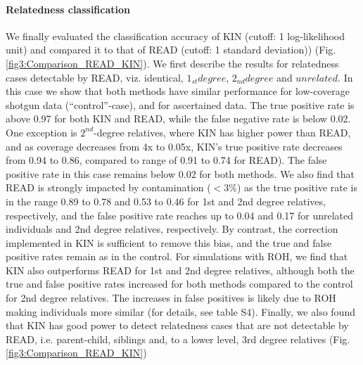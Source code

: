 \documentclass[12pt, letterpaper]{article}
\begin{document}
\paragraph{Relatedness classification}
We finally evaluated the classification accuracy of KIN (cutoff: 1 log-likelihood unit) and compared it to that of READ (cutoff: 1 standard deviation)) (Fig. \ref{fig3:Comparison_READ_KIN}). We first describe the results for relatedness cases detectable by READ, viz. identical, $1_{st} degree$, $2_{nd} degree$ and $unrelated$. In this case we show that both methods have similar performance for low-coverage shotgun data (``control''-case), and for ascertained data. The true positive rate is above 0.97 for both KIN and READ, while the false negative rate is below 0.02.  One exception is  $2^{nd}$-degree relatives, where KIN has higher power than READ, and as coverage decreases from 4x to 0.05x, KIN's true positive rate decreases from 0.94 to 0.86, compared to range of 0.91 to 0.74 for READ). The false positive rate in this case remains below 0.02 for both methods. We also find that READ is strongly impacted by contamination ($<3\%$) as the true positive rate is in the range 0.89 to 0.78 and 0.53 to 0.46 for 1st and 2nd degree relatives, respectively, and the false positive rate reaches up to 0.04 and 0.17 for unrelated individuals and 2nd degree relatives, respectively. By contrast, the correction implemented in KIN is sufficient to remove this bias, and the true and false positive rates remain as in the control. For simulations with ROH, we find that KIN also outperforms READ for 1st and 2nd degree relatives, although both the true and false positive rates increased for both methods compared to the control for 2nd degree relatives. The increases in false positives is likely due to ROH making individuals more similar (for details, see table S4). Finally, we also found that KIN has good power to detect relatedness cases that are not detectable by READ, i.e. parent-child, siblings and, to a lower level, 3rd degree relatives (Fig. \ref{fig3:Comparison_READ_KIN})
\end{document}
